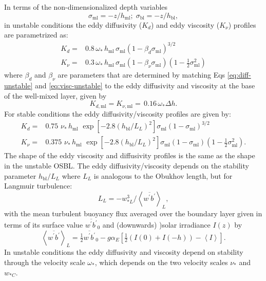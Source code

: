 \documentclass[../main/NEMO_manual]{subfiles}
\begin{document}
In terms of the non-dimensionalized depth variables
%
\begin{equation}\label{eq:sigma}
\sigma_{\mathrm{ml}}= -z/h_{\mathrm{ml}}; \;\sigma_{\mathrm{bl}}= -z/h_{\mathrm{bl}},
\end{equation}
%
in unstable conditions the eddy diffusivity ($K_d$) and eddy viscosity ($K_\nu$) profiles are parametrized as:
%
\begin{align}\label{eq:diff-unstable}
K_d=&0.8\, \omega_*\, h_{\mathrm{ml}} \, \sigma_{\mathrm{ml}} \left(1-\beta_d \sigma_{\mathrm{ml}}\right)^{3/2}
\\\label{eq:visc-unstable}
K_\nu =& 0.3\, \omega_* \,h_{\mathrm{ml}}\, \sigma_{\mathrm{ml}} \left(1-\beta_\nu \sigma_{\mathrm{ml}}\right)\left(1-\tfrac{1}{2}\sigma_{\mathrm{ml}}^2\right)
\end{align}
%
where $\beta_d$ and $\beta_\nu$ are parameters that are determined by matching Eqs \ref{eq:diff-unstable} and \ref{eq:visc-unstable} to the eddy diffusivity and viscosity at the base of the well-mixed layer, given by
%
\begin{equation}\label{eq:diff-wml-base}
K_{d,\mathrm{ml}}=K_{\nu,\mathrm{ml}}=\,0.16\,\omega_* \Delta h.
\end{equation}
%
For stable conditions the eddy diffusivity/viscosity profiles are given by:
%
\begin{align}\label{diff-stable}
K_d= & 0.75\,\, \nu_*\, h_{\mathrm{ml}}\,\,  \exp\left[-2.8 \left(h_{\mathrm{bl}}/L_L\right)^2\right]\sigma_{\mathrm{ml}} \left(1-\sigma_{\mathrm{ml}}\right)^{3/2} \\\label{eq:visc-stable}
K_\nu = & 0.375\,\,  \nu_*\, h_{\mathrm{ml}} \,\, \exp\left[-2.8 \left(h_{\mathrm{bl}}/L_L\right)^2\right] \sigma_{\mathrm{ml}} \left(1-\sigma_{\mathrm{ml}}\right)\left(1-\tfrac{1}{2}\sigma_{\mathrm{ml}}^2\right).
\end{align}
%
The shape of the eddy viscosity and diffusivity profiles is the same as the shape in the unstable OSBL. The eddy diffusivity/viscosity depends on the stability parameter $h_{\mathrm{bl}}/{L_L}$ where $ L_L$ is analogous to the Obukhov length, but for Langmuir turbulence:
\begin{equation}\label{eq:L_L}
  L_L=-w_{*L}^3/\left<\overline{w^\prime b^\prime}\right>_L,
\end{equation}
with the mean turbulent buoyancy flux averaged over the boundary layer given in terms of its surface value $\overline{w^\prime b^\prime}_0$ and (downwards) )solar irradiance $I(z)$ by
\begin{equation} \label{eq:stable-av-buoy-flux}
\left<\overline{w^\prime b^\prime}\right>_L = \tfrac{1}{2} {\overline{w^\prime b^\prime}}_0-g\alpha_E\left[\tfrac{1}{2}(I(0)+I(-h))-\left<I\right>\right].
\end{equation}
%
In unstable conditions the eddy diffusivity and viscosity depend on stability through the velocity scale $\omega_*$, which depends on the two velocity scales $\nu_*$ and $w_{*C}$.
\end{document}
